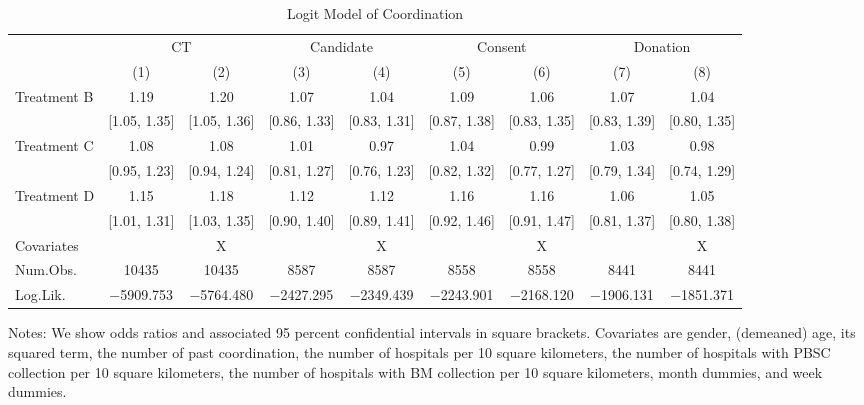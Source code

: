 \documentclass[12pt, a4paper]{article}
\begin{document}
\begin{table}[H]

\caption{\label{tab:logit-coordination}Logit Model of Coordination}
\centering
\fontsize{9}{11}\selectfont
\begin{threeparttable}
\begin{tabular}[t]{lcccccccc}
\toprule
\multicolumn{1}{c}{ } & \multicolumn{2}{c}{CT} & \multicolumn{2}{c}{Candidate} & \multicolumn{2}{c}{Consent} & \multicolumn{2}{c}{Donation} \\
\cmidrule(l{3pt}r{3pt}){2-3} \cmidrule(l{3pt}r{3pt}){4-5} \cmidrule(l{3pt}r{3pt}){6-7} \cmidrule(l{3pt}r{3pt}){8-9}
  & (1) & (2) & (3) & (4) & (5) & (6) & (7) & (8)\\
\midrule
Treatment B & \num{1.19} & \num{1.20} & \num{1.07} & \num{1.04} & \num{1.09} & \num{1.06} & \num{1.07} & \num{1.04}\\
 & {}[\num{1.05}, \num{1.35}] & {}[\num{1.05}, \num{1.36}] & {}[\num{0.86}, \num{1.33}] & {}[\num{0.83}, \num{1.31}] & {}[\num{0.87}, \num{1.38}] & {}[\num{0.83}, \num{1.35}] & {}[\num{0.83}, \num{1.39}] & {}[\num{0.80}, \num{1.35}]\\
Treatment C & \num{1.08} & \num{1.08} & \num{1.01} & \num{0.97} & \num{1.04} & \num{0.99} & \num{1.03} & \num{0.98}\\
 & {}[\num{0.95}, \num{1.23}] & {}[\num{0.94}, \num{1.24}] & {}[\num{0.81}, \num{1.27}] & {}[\num{0.76}, \num{1.23}] & {}[\num{0.82}, \num{1.32}] & {}[\num{0.77}, \num{1.27}] & {}[\num{0.79}, \num{1.34}] & {}[\num{0.74}, \num{1.29}]\\
Treatment D & \num{1.15} & \num{1.18} & \num{1.12} & \num{1.12} & \num{1.16} & \num{1.16} & \num{1.06} & \num{1.05}\\
 & {}[\num{1.01}, \num{1.31}] & {}[\num{1.03}, \num{1.35}] & {}[\num{0.90}, \num{1.40}] & {}[\num{0.89}, \num{1.41}] & {}[\num{0.92}, \num{1.46}] & {}[\num{0.91}, \num{1.47}] & {}[\num{0.81}, \num{1.37}] & {}[\num{0.80}, \num{1.38}]\\
\midrule
Covariates &  & X &  & X &  & X &  & X\\
Num.Obs. & \num{10435} & \num{10435} & \num{8587} & \num{8587} & \num{8558} & \num{8558} & \num{8441} & \num{8441}\\
Log.Lik. & \num{-5909.753} & \num{-5764.480} & \num{-2427.295} & \num{-2349.439} & \num{-2243.901} & \num{-2168.120} & \num{-1906.131} & \num{-1851.371}\\
\bottomrule
\end{tabular}
\begin{tablenotes}
\item Notes: We show odds ratios and associated 95 percent confidential intervals in square brackets. Covariates are gender, (demeaned) age, its squared term, the number of past coordination, the number of hospitals per 10 square kilometers, the number of hospitals with PBSC collection per 10 square kilometers, the number of hospitals with BM collection per 10 square kilometers, month dummies, and week dummies.
\end{tablenotes}
\end{threeparttable}
\end{table}

\clearpage


\end{document}
